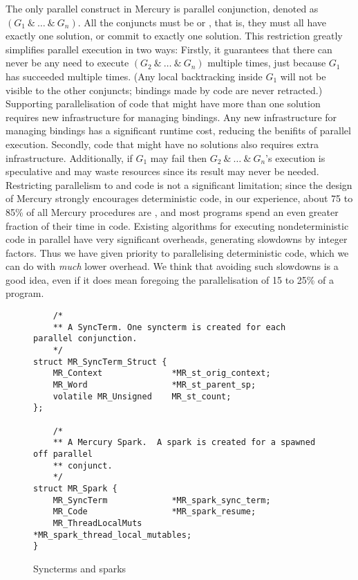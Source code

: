 The only parallel construct in Mercury is parallel conjunction,
denoted as $(G_1~\&~\ldots~\&~G_n)$.
All the conjuncts must be \ddet or \dccmulti,
that is, they must all have exactly one solution,
or commit to exactly one solution.
This restriction greatly simplifies parallel execution in two ways:
Firstly,
it guarantees that there can never be any need
to execute $(G_2~\&~\ldots~\&~G_n)$ multiple times,
just because $G_1$ has succeeded multiple times.
(Any local backtracking inside $G_1$ will not be visible to the other
conjuncts;
bindings made by \ddet code are never retracted.)
Supporting parallelisation of
code that might have more than one solution
requires new infrastructure for managing bindings.
Any new infrastructure for managing bindings has a significant runtime cost,
reducing the benifits of parallel execution.
Secondly,
code that might have no solutions also requires extra infrastructure.
Additionally,
if $G_1$ may fail then
$G_2~\&~\ldots~\&~G_n$'s execution is speculative and may waste resources
since its result may never be needed.
Restricting parallelism to \ddet and \dccmulti code is not a significant
limitation;
since the design of Mercury strongly encourages deterministic code,
in our experience, about 75 to 85\% of all Mercury procedures are \ddet,
and most programs spend an even greater fraction of their time in \ddet code.
Existing algorithms for executing nondeterministic code in parallel
have very significant overheads, generating slowdowns by integer factors.
Thus we have given priority to parallelising deterministic code,
which we can do with \emph{much} lower overhead.
We think that avoiding such slowdowns is a good idea,
even if it does mean foregoing the parallelisation of 15 to 25\% of a program.

\begin{figure}
\begin{verbatim}
    /*
    ** A SyncTerm. One syncterm is created for each parallel conjunction.
    */
struct MR_SyncTerm_Struct {
    MR_Context              *MR_st_orig_context;
    MR_Word                 *MR_st_parent_sp;
    volatile MR_Unsigned    MR_st_count;
};

    /*
    ** A Mercury Spark.  A spark is created for a spawned off parallel
    ** conjunct.
    */
struct MR_Spark {
    MR_SyncTerm             *MR_spark_sync_term;
    MR_Code                 *MR_spark_resume;
    MR_ThreadLocalMuts      *MR_spark_thread_local_mutables;
}
\end{verbatim}
\caption{Syncterms and sparks}
\label{fig:spark_and_syncterm}
\end{figure}

